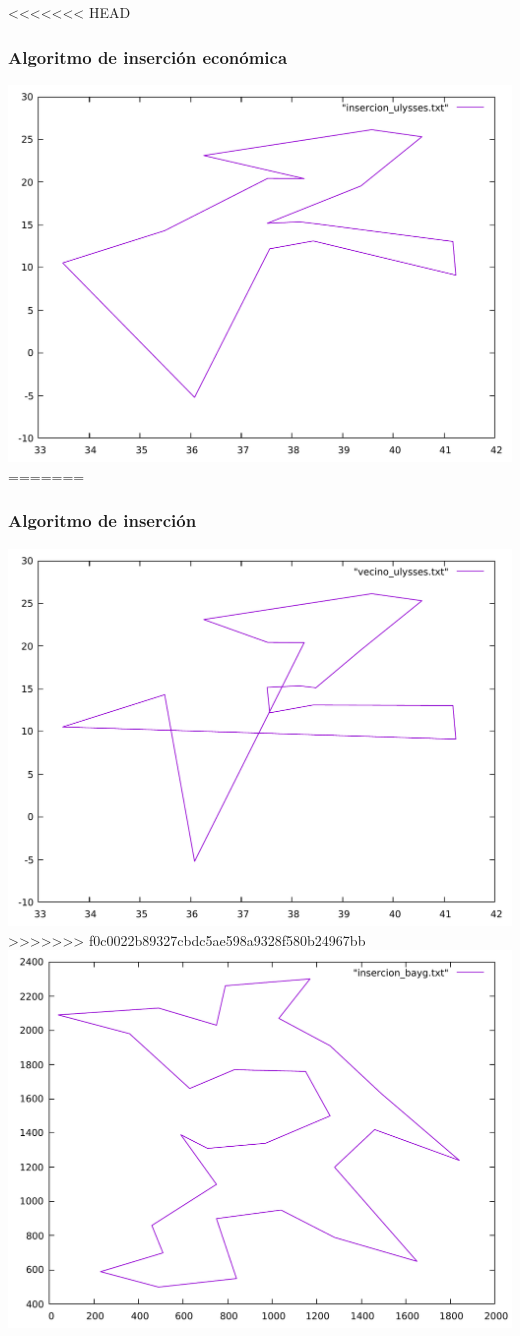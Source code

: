\documentclass[13pt]{beamer}
\begin{document}
	\begin{frame}
<<<<<<< HEAD
		\frametitle{Algoritmo de inserción económica}
			\includegraphics[scale=0.2]{../src/insercion_ulysses.pdf}
=======
		\frametitle{Algoritmo de inserción}
			\includegraphics[scale=0.2]{../src/vecino_ulysses.pdf}
>>>>>>> f0c0022b89327cbdc5ae598a9328f580b24967bb
			\includegraphics[scale=0.2]{../src/insercion_bayg.pdf}

\end{frame}
\end{document}
